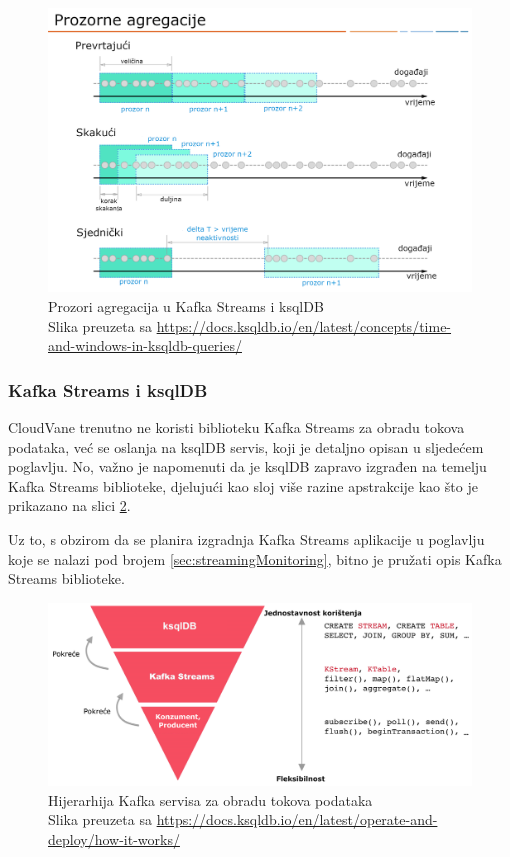 \documentclass[times, utf8, diplomski]{fer}
\begin{document}
\begin{figure}[htb]
	\centering
	\includegraphics[width=15cm]{images/Windows.png}
	\caption[Prozori agregacija u Kafka Streams i ksqlDB]{Prozori agregacija u Kafka Streams i ksqlDB\\Slika preuzeta sa \url{https://docs.ksqldb.io/en/latest/concepts/time-and-windows-in-ksqldb-queries/}}
	\label{fig:windows}
\end{figure}

\subsubsection{Kafka Streams i ksqlDB}

CloudVane trenutno ne koristi biblioteku Kafka Streams za obradu tokova podataka, već se oslanja na ksqlDB servis, koji je detaljno opisan u sljedećem poglavlju. No, važno je napomenuti da je ksqlDB zapravo izgrađen na temelju Kafka Streams biblioteke, djelujući kao sloj više razine apstrakcije kao što je prikazano na slici \ref{fig:ksqldb_streams}.

Uz to, s obzirom da se planira izgradnja Kafka Streams aplikacije u poglavlju koje se nalazi pod brojem \ref{sec:streamingMonitoring}, bitno je pružati opis Kafka Streams biblioteke.

\begin{figure}[htb]
	\centering
	\includegraphics[width=13cm]{images/ksql_streams_consumer.png}
	\caption[Hijerarhija Kafka servisa za obradu tokova podataka]{Hijerarhija Kafka servisa za obradu tokova podataka\\Slika preuzeta sa \url{https://docs.ksqldb.io/en/latest/operate-and-deploy/how-it-works/}}
	\label{fig:ksqldb_streams}
\end{figure}
\end{document}
